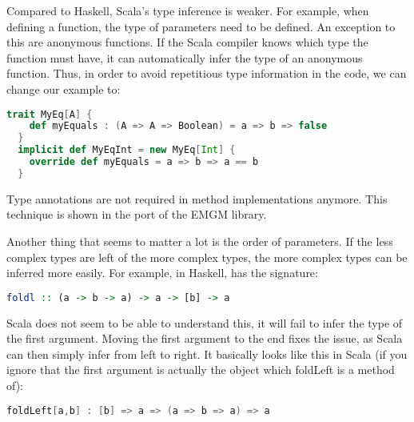 Compared to Haskell, Scala's type inference is weaker. For example, when
defining a function, the type of parameters need to be defined. An exception
to this are anonymous functions. If the Scala compiler knows which type the
function must have, it can automatically infer the type of an anonymous
function. Thus, in order to avoid repetitious type information in the code,
we can change our  example to:
\begin{lstlisting}[language=Scala,gobble=6]
  trait MyEq[A] {
    def myEquals : (A => A => Boolean) = a => b => false
  }
  implicit def MyEqInt = new MyEq[Int] {
    override def myEquals = a => b => a == b
  }
\end{lstlisting}
Type annotations are not required in method implementations anymore. This
technique is shown in the port of the EMGM library.

Another thing that seems to matter a lot is the order of parameters. If
the less complex types are left of the more complex types, the more
complex types can be inferred more easily. For example, in Haskell,
 has the signature:
\begin{lstlisting}[language=Haskell,gobble=6]
  foldl :: (a -> b -> a) -> a -> [b] -> a
\end{lstlisting}
Scala does not seem to be able to understand this, it will fail to
infer the type of the first argument. Moving the first argument to
the end fixes the issue, as Scala can then simply infer from left
to right. It basically looks like this in Scala (if you ignore that
the first argument is actually the object which foldLeft is a method
of):
\begin{lstlisting}[language=Scala,gobble=6]
  foldLeft[a,b] : [b] => a => (a => b => a) => a
\end{lstlisting}

